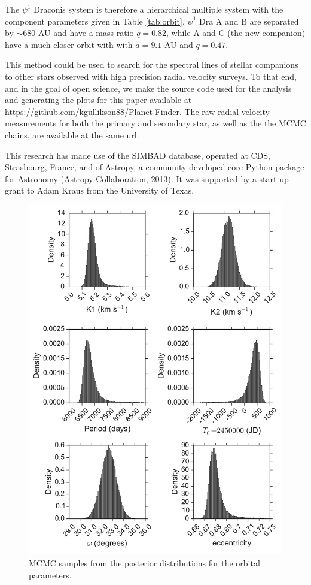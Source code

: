 \documentclass[twocolumn]{emulateapj}
\begin{document}
The $\psi^1$ Draconis system is therefore a hierarchical multiple system with the component parameters given in Table \ref{tab:orbit}. $\psi^1$ Dra A and B are separated by $\sim 680$ AU and have a mass-ratio $q = 0.82$, while A and C (the new companion) have a much closer orbit with with $a = 9.1$ AU and $q = 0.47$. 

This method could be used to search for the spectral lines of stellar companions to other stars observed with high precision radial velocity surveys. To that end, and in the goal of open science, we make the source code used for the analysis and generating the plots for this paper available at \url{https://github.com/kgullikson88/Planet-Finder}. The raw radial velocity measurements for both the primary and secondary star, as well as the the MCMC chains, are available at the same url.

This research has made use of the SIMBAD database, operated at CDS, Strasbourg, France, and of Astropy, a community-developed core Python package for Astronomy (Astropy Collaboration, 2013).
It was supported by a start-up grant to Adam Kraus from the University of Texas.



\begin{figure}
  \centering
  \includegraphics[width=\columnwidth]{Distributions_1.pdf}
  \caption{MCMC samples from the posterior distributions for the orbital parameters.}
  \label{fig:orbit_dist}
\end{figure}
\end{document}

